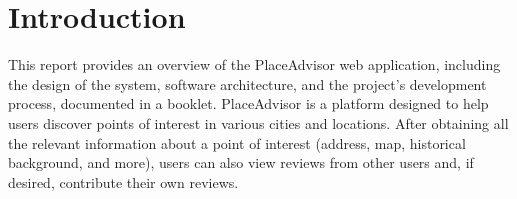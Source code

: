 \documentclass[../main.tex]{subfiles}
\begin{document}
\section{Introduction}\label{sec:introduction}

This report provides an overview of the PlaceAdvisor web application, including the design of the system, software architecture, and the project's development process, documented in a booklet. PlaceAdvisor is a platform designed to help users discover points of interest in various cities and locations. After obtaining all the relevant information about a point of interest (address, map, historical background, and more), users can also view reviews from other users and, if desired, contribute their own reviews.
\end{document}
